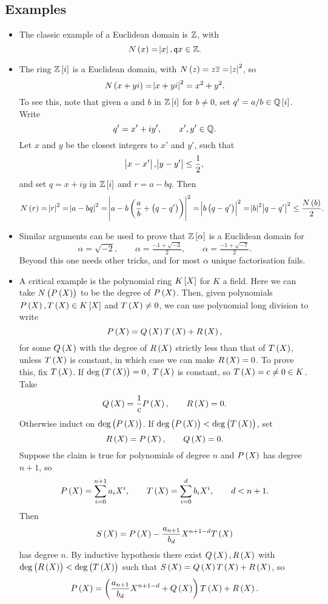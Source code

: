 \pagebreak

\subsection{Examples}

\begin{example*}
\hfill
\begin{itemize}
\item The classic example of a Euclidean domain is $ \mathbb{Z} $, with
$$ N\br{x} = \abs{x}, \qq x \in \Z. $$
\item The ring $ \Z\sbr{i} $ is a Euclidean domain, with $ N\br{z} = z\overline{z} = \abs{z}^2 $, so
$$ N\br{x + yi} = \abs{x + yi}^2 = x^2 + y^2. $$
To see this, note that given $ a $ and $ b $ in $ \Z\sbr{i} $ for $ b \ne 0 $, set $ q' = a / b \in \Q\sbr{i} $. Write
$$ q' = x' + iy', \qquad x', y' \in \mathbb{Q}. $$
Let $ x $ and $ y $ be the closest integers to $ x' $ and $ y' $, such that
$$ \abs{x - x'}, \abs{y - y'} \le \dfrac{1}{2}, $$
and set $ q = x + iy $ in $ \Z\sbr{i} $ and $ r = a - bq $. Then
$$ N\br{r} = \abs{r}^2 = \abs{a - bq}^2 = \abs{a - b\br{\dfrac{a}{b} + \br{q - q'}}}^2 = \abs{b\br{q - q'}}^2 = \abs{b}^2\abs{q - q'}^2 \le \dfrac{N\br{b}}{2}. $$
\item Similar arguments can be used to prove that $ \Z\sbr{\alpha} $ is a Euclidean domain for
$$ \alpha = \sqrt{-2}, \qquad \alpha = \tfrac{-1 + \sqrt{-3}}{2}, \qquad \alpha = \tfrac{-1 + \sqrt{-7}}{2}. $$
Beyond this one needs other tricks, and for most $ \alpha $ unique factorisation fails.
\item A critical example is the polynomial ring $ K\sbr{X} $ for $ K $ a field. Here we can take $ N\br{P\br{X}} $ to be the degree of $ P\br{X} $. Then, given polynomials $ P\br{X}, T\br{X} \in K\sbr{X} $ and $ T\br{X} \ne 0 $, we can use polynomial long division to write
$$ P\br{X} = Q\br{X}T\br{X} + R\br{X}, $$
for some $ Q\br{X} $ with the degree of $ R\br{X} $ strictly less than that of $ T\br{X} $, unless $ T\br{X} $ is constant, in which case we can make $ R\br{X} = 0 $. To prove this, fix $ T\br{X} $. If $ \deg\br{T\br{X}} = 0 $, $ T\br{X} $ is constant, so $ T\br{X} = c \ne 0 \in K $. Take
$$ Q\br{X} = \dfrac{1}{c}P\br{X}, \qquad R\br{X} = 0. $$
Otherwise induct on $ \deg\br{P\br{X}} $. If $ \deg\br{P\br{X}} < \deg\br{T\br{X}} $, set
$$ R\br{X} = P\br{X}, \qquad Q\br{X} = 0. $$
Suppose the claim is true for polynomials of degree $ n $ and $ P\br{X} $ has degree $ n + 1 $, so
$$ P\br{X} = \sum_{i = 0}^{n + 1} a_iX^i, \qquad T\br{X} = \sum_{i = 0}^d b_iX^i, \qquad d < n + 1. $$
Then
$$ S\br{X} = P\br{X} - \dfrac{a_{n + 1}}{b_d}X^{n + 1 - d}T\br{X} $$
has degree $ n $. By inductive hypothesis there exist $ Q\br{X}, R\br{X} $ with $ \deg\br{R\br{X}} < \deg\br{T\br{X}} $ such that $ S\br{X} = Q\br{X}T\br{X} + R\br{X} $, so
$$ P\br{X} = \br{\dfrac{a_{n + 1}}{b_d}X^{n + 1 - d} + Q\br{X}}T\br{X} + R\br{X}. $$
\end{itemize}
\end{example*}

